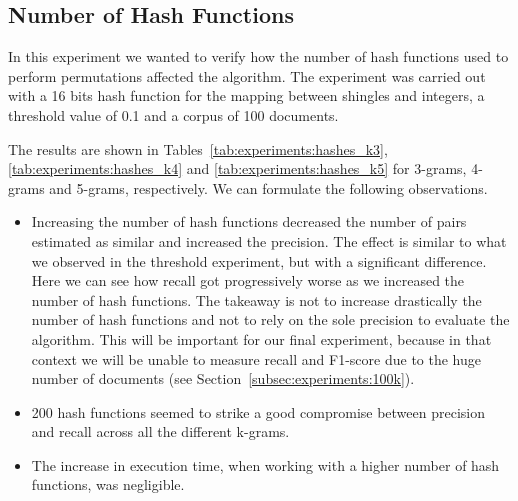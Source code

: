 \documentclass[runningheads]{llncs}
\begin{document}
\subsection{Number of Hash Functions}
\label{subsec:experiments:hashes}

In this experiment we wanted to verify how the number of hash functions used to perform permutations affected the algorithm. The experiment was carried out with a 16 bits hash function for the mapping between shingles and integers, a threshold value of 0.1 and a corpus of 100 documents.

The results are shown in Tables~\ref{tab:experiments:hashes_k3}, \ref{tab:experiments:hashes_k4} and \ref{tab:experiments:hashes_k5} for 3-grams, 4-grams and 5-grams, respectively. We can formulate the following observations.

\begin{itemize}
  \item Increasing the number of hash functions decreased the number of pairs estimated as similar and increased the precision. The effect is similar to what we observed in the threshold experiment, but with a significant difference. Here we can see how recall got progressively worse as we increased the number of hash functions. The takeaway is not to increase drastically the number of hash functions and not to rely on the sole precision to evaluate the algorithm. This will be important for our final experiment, because in that context we will be unable to measure recall and F1-score due to the huge number of documents (see Section~\ref{subsec:experiments:100k}). 
  \item 200 hash functions seemed to strike a good compromise between precision and recall across all the different k-grams.
  \item The increase in execution time, when working with a higher number of hash functions, was negligible.
\end{itemize}
\end{document}
